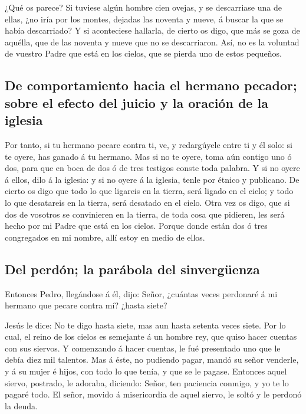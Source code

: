  ¿Qué os parece? Si tuviese algún hombre cien ovejas, y se
descarriase una de ellas, ¿no iría por los montes, dejadas las noventa y
nueve, á buscar la que se había descarriado?  Y si
aconteciese hallarla, de cierto os digo, que más se goza de aquélla, que
de las noventa y nueve que no se descarriaron.  Así, no es
la voluntad de vuestro Padre que está en los cielos, que se pierda uno
de estos pequeños.

\hypertarget{de-comportamiento-hacia-el-hermano-pecador-sobre-el-efecto-del-juicio-y-la-oraciuxf3n-de-la-iglesia}{%
\subsection{De comportamiento hacia el hermano pecador; sobre el efecto
del juicio y la oración de la
iglesia}\label{de-comportamiento-hacia-el-hermano-pecador-sobre-el-efecto-del-juicio-y-la-oraciuxf3n-de-la-iglesia}}

 Por tanto, si tu hermano pecare contra ti, ve, y
redargúyele entre ti y él solo: si te oyere, has ganado á tu hermano.
 Mas si no te oyere, toma aún contigo uno ó dos, para que
en boca de dos ó de tres testigos conste toda palabra.  Y
si no oyere á ellos, dilo á la iglesia: y si no oyere á la iglesia,
tenle por étnico y publicano.  De cierto os digo que todo
lo que ligareis en la tierra, será ligado en el cielo; y todo lo que
desatareis en la tierra, será desatado en el cielo.  Otra
vez os digo, que si dos de vosotros se convinieren en la tierra, de toda
cosa que pidieren, les será hecho por mi Padre que está en los cielos.
 Porque donde están dos ó tres congregados en mi nombre,
allí estoy en medio de ellos.

\hypertarget{del-perduxf3n-la-paruxe1bola-del-sinverguxfcenza}{%
\subsection{Del perdón; la parábola del
sinvergüenza}\label{del-perduxf3n-la-paruxe1bola-del-sinverguxfcenza}}

 Entonces Pedro, llegándose á él, dijo: Señor, ¿cuántas
veces perdonaré á mi hermano que pecare contra mí? ¿hasta siete?

 Jesús le dice: No te digo hasta siete, mas aun hasta
setenta veces siete.  Por lo cual, el reino de los cielos
es semejante á un hombre rey, que quiso hacer cuentas con sus siervos.
 Y comenzando á hacer cuentas, le fué presentado uno que le
debía diez mil talentos.  Mas á éste, no pudiendo pagar,
mandó su señor venderle, y á su mujer é hijos, con todo lo que tenía, y
que se le pagase.  Entonces aquel siervo, postrado, le
adoraba, diciendo: Señor, ten paciencia conmigo, y yo te lo pagaré todo.
 El señor, movido á misericordia de aquel siervo, le soltó
y le perdonó la deuda.

